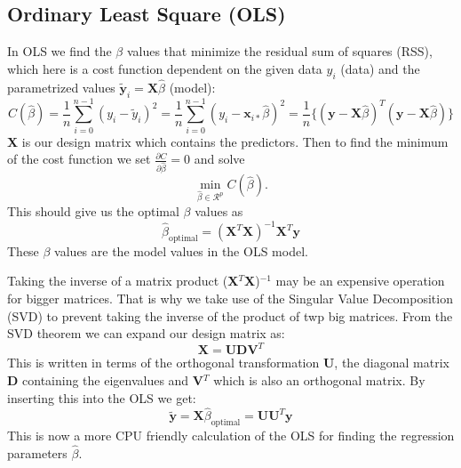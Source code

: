 \documentclass[12pt,a4paper,english]{article}
\begin{document}
\subsection{Ordinary Least Square (OLS)}
In OLS we find the $\beta$ values that minimize the residual sum of squares (RSS), which here is a cost function dependent on the given data $y_i$ (data) and the parametrized values $\tilde{\textbf{y}}_i=\textbf{X}\hat{\beta}$ (model):
\begin{equation}
\label{eq:cost_OLS}
C(\hat{\beta})=\frac{1}{n}\sum_{i=0}^{n-1}(y_i-\tilde{y}_i)^2=\frac{1}{n}\sum_{i=0}^{n-1}(y_i-\textbf{x}_{i*}\hat{\beta})^2=\frac{1}{n}\{(\textbf{y}-\textbf{X}\hat{\beta})^T(\textbf{y}-\textbf{X}\hat{\beta})\}
\end{equation} 
\textbf{X} is our design matrix which contains the predictors. Then to find the minimum of the cost function we set $\frac{\partial C}{\partial \hat{\beta}}=0$ and solve
\[\min_{\hat{\beta}\in \mathcal{R}^p}C(\hat{\beta}).\] This should give us the optimal $\beta$ values as
\begin{equation}
\label{eq:beta_OLS_opt}
\hat{\beta}_{\text{optimal}}=(\textbf{X}^T\textbf{X})^{-1}\textbf{X}^T\textbf{y}
\end{equation}
These $\beta$ values are the model values in the OLS model.

Taking the inverse of a matrix product (\textbf{X}$^T$\textbf{X})$^{-1}$ may be an expensive operation for bigger matrices. That is why we take use of the Singular Value Decomposition (SVD) to prevent taking the inverse of the product of twp big matrices. From the SVD theorem we can expand our design matrix as:
\[\textbf{X}=\textbf{U}\textbf{D}\textbf{V}^T\]
This is written in terms of the orthogonal transformation \textbf{U}, the diagonal matrix \textbf{D} containing the eigenvalues and \textbf{V}$^T$ which is also an orthogonal matrix. By inserting this into the OLS we get:
\begin{equation}
\label{eq:beta_SVD_OLS}
\tilde{\textbf{y}}=\textbf{X}\hat{\beta}_{\text{optimal}}=\textbf{U}\textbf{U}^T\textbf{y}
\end{equation}
This is now a more CPU friendly calculation of the OLS for finding the regression parameters $\hat{\beta}$.
\end{document}
